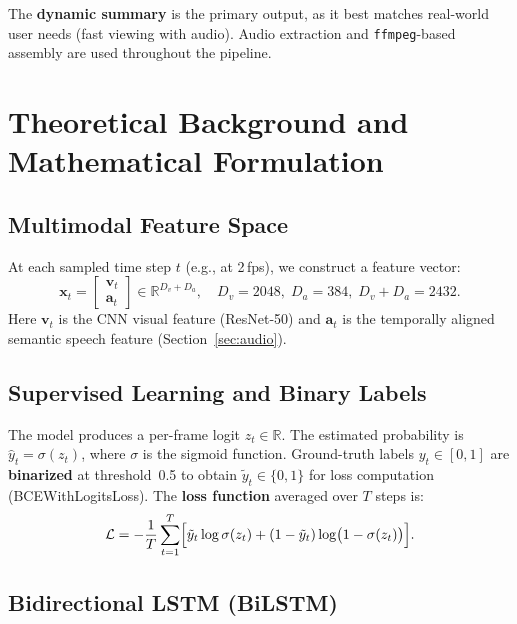 \documentclass[10pt,conference]{IEEEtran}
\begin{document}
The \textbf{dynamic summary} is the primary output, as it best matches
real-world user needs (fast viewing with audio). Audio extraction and
\texttt{ffmpeg}-based assembly are used throughout the pipeline.

\section{Theoretical Background and Mathematical Formulation}

\subsection{Multimodal Feature Space}

At each sampled time step $t$ (e.g., at 2\,fps), we construct a feature
vector:
\begin{equation}
  \mathbf{x}_t =
  \begin{bmatrix}
    \mathbf{v}_t \\ \mathbf{a}_t
  \end{bmatrix}
  \in \mathbb{R}^{D_v + D_a},
  \quad D_v = 2048,\; D_a = 384,\; D_v + D_a = 2432.
\end{equation}
Here $\mathbf{v}_t$ is the CNN visual feature (ResNet-50) and $\mathbf{a}_t$
is the temporally aligned semantic speech feature (Section~\ref{sec:audio}).

\subsection{Supervised Learning and Binary Labels}

The model produces a per-frame logit $z_t \in \mathbb{R}$. The estimated
probability is $\hat{y}_t = \sigma(z_t)$, where $\sigma$ is the sigmoid
function. Ground-truth labels $y_t \in [0,1]$ are \textbf{binarized} at
threshold~0.5 to obtain $\tilde{y}_t \in \{0,1\}$ for loss computation
(BCEWithLogitsLoss). The \textbf{loss function} averaged over $T$ steps is:
\begin{equation}
  \mathcal{L}
  = -\frac{1}{T}\sum_{t=1}^{T}
  \Bigl[
    \tilde{y}_t \log \sigma(z_t)
    + (1 - \tilde{y}_t)\log\bigl(1 - \sigma(z_t)\bigr)
  \Bigr].
  \label{eq:bce}
\end{equation}

\subsection{Bidirectional LSTM (BiLSTM)}
\end{document}
